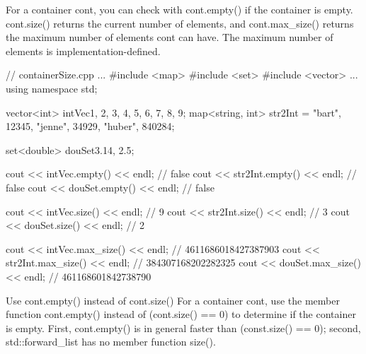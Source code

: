 For a container cont, you can check with cont.empty() if the container is empty. cont.size() returns the current number of elements, and cont.max\_size() returns the maximum number of elements cont can have. The maximum number of elements is implementation-defined.


\begin{cpp}
// containerSize.cpp
...
#include <map>
#include <set>
#include <vector>
...
using namespace std;

vector<int> intVec{1, 2, 3, 4, 5, 6, 7, 8, 9};
map<string, int> str2Int = {{"bart", 12345},
	{"jenne", 34929}, {"huber", 840284}};
	
set<double> douSet{3.14, 2.5};

cout << intVec.empty() << endl; // false
cout << str2Int.empty() << endl; // false
cout << douSet.empty() << endl; // false

cout << intVec.size() << endl; // 9
cout << str2Int.size() << endl; // 3
cout << douSet.size() << endl; // 2

cout << intVec.max_size() << endl; // 4611686018427387903
cout << str2Int.max_size() << endl; // 384307168202282325
cout << douSet.max_size() << endl; // 461168601842738790
\end{cpp}


\begin{myTip}{Use cont.empty() instead of cont.size()}
For a container cont, use the member function cont.empty() instead of (cont.size() == 0) to determine if the container is empty. First, cont.empty() is in general faster than (const.size() == 0); second, std::forward\_list has no member function size().	
\end{myTip}











